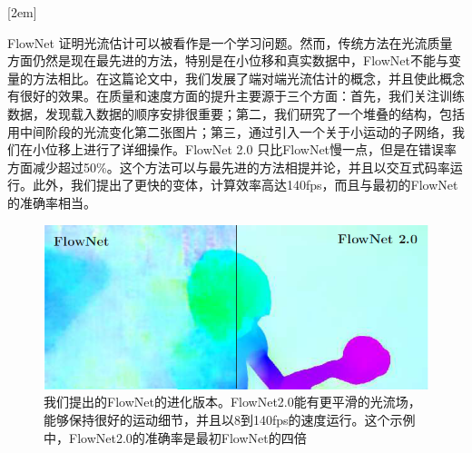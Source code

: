 
[2em]{\vspace{.5\baselineskip}\xiaosan\song}
             {\prechaptername\CJKnumber{\thecontentslabel}\postchaptername\qquad}{}
             {}             %
\setcounter{page}{1}            %

\par\setlength{\parindent}{2em} FlowNet 证明光流估计可以被看作是一个学习问题。然而，传统方法在光流质量方面仍然是现在最先进的方法，特别是在小位移和真实数据中，FlowNet不能与变量的方法相比。在这篇论文中，我们发展了端对端光流估计的概念，并且使此概念有很好的效果。在质量和速度方面的提升主要源于三个方面：首先，我们关注训练数据，发现载入数据的顺序安排很重要；第二，我们研究了一个堆叠的结构，包括用中间阶段的光流变化第二张图片；第三，通过引入一个关于小运动的子网络，我们在小位移上进行了详细操作。FlowNet 2.0 只比FlowNet慢一点，但是在错误率方面减少超过50\%。这个方法可以与最先进的方法相提并论，并且以交互式码率运行。此外，我们提出了更快的变体，计算效率高达140fps，而且与最初的FlowNet的准确率相当。
\begin{figure}[h]
	\centering
	\includegraphics[width=1\textwidth]{figures/translate/1.png}
	\caption{我们提出的FlowNet的进化版本。FlowNet2.0能有更平滑的光流场，能够保持很好的运动细节，并且以8到140fps的速度运行。这个示例中，FlowNet2.0的准确率是最初FlowNet的四倍}
	\label{fig1}
\end{figure}




